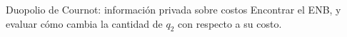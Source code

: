 \documentclass[12pt]{article}
\begin{document}
\begin{exbox}{Duopolio de Cournot: información privada sobre costos}
	Encontrar el ENB, y evaluar cómo cambia la cantidad de $q_2$ con respecto a su costo.














\end{exbox}
\end{document}
